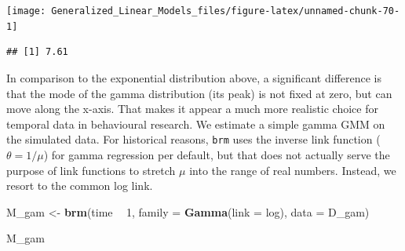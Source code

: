 \documentclass[]{svmono}
\newenvironment{Shaded}{\begin{snugshade}}{\end{snugshade}}
\newcommand{\KeywordTok}[1]{\textcolor[rgb]{0.13,0.29,0.53}{\textbf{#1}}}
\newcommand{\DataTypeTok}[1]{\textcolor[rgb]{0.13,0.29,0.53}{#1}}
\newcommand{\DecValTok}[1]{\textcolor[rgb]{0.00,0.00,0.81}{#1}}
\newcommand{\StringTok}[1]{\textcolor[rgb]{0.31,0.60,0.02}{#1}}
\newcommand{\OperatorTok}[1]{\textcolor[rgb]{0.81,0.36,0.00}{\textbf{#1}}}
\newcommand{\NormalTok}[1]{#1}
\begin{document}
\begin{Shaded}
\end{Shaded}

\texttt{[image: Generalized\_Linear\_Models\_files/figure-latex/unnamed-chunk-70-1]}

\begin{Shaded}
\end{Shaded}

\begin{verbatim}
## [1] 7.61
\end{verbatim}

In comparison to the exponential distribution above, a significant
difference is that the mode of the gamma distribution (its peak) is not
fixed at zero, but can move along the x-axis. That makes it appear a
much more realistic choice for temporal data in behavioural research. We
estimate a simple gamma GMM on the simulated data. For historical
reasons, \texttt{brm} uses the inverse link function
(\(\theta = 1/\mu\)) for gamma regression per default, but that does not
actually serve the purpose of link functions to stretch \(\mu\) into the
range of real numbers. Instead, we resort to the common log link.

\begin{Shaded}
\begin{Highlighting}[]
\NormalTok{M_gam <-}\StringTok{ }\KeywordTok{brm}\NormalTok{(time }\OperatorTok{~}\StringTok{ }\DecValTok{1}\NormalTok{, }
             \DataTypeTok{family =} \KeywordTok{Gamma}\NormalTok{(}\DataTypeTok{link =}\NormalTok{ log), }
             \DataTypeTok{data =}\NormalTok{ D_gam)}

\NormalTok{M_gam}
\end{Highlighting}
\end{Shaded}
\end{document}
